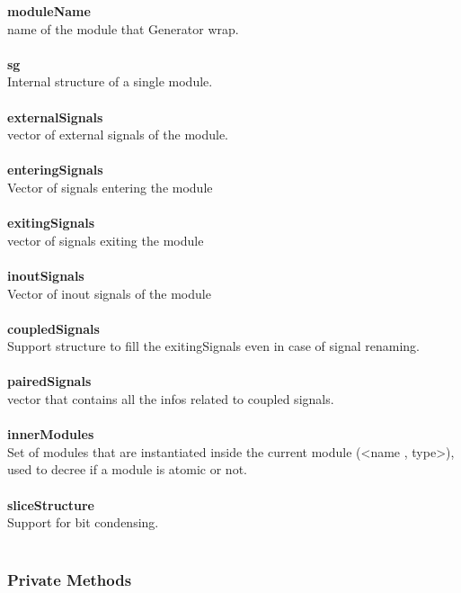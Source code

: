 \documentclass{article}
\begin{document}
\textbf{moduleName}\\
name of the module that Generator wrap.\\\\

\textbf{sg}\\
Internal structure of a single module.\\\\

\textbf{externalSignals}\\
vector of external signals of the module.\\\\

\textbf{enteringSignals}\\
Vector of signals entering the module\\\\

\textbf{exitingSignals}\\
vector of signals exiting the module\\\\

\textbf{inoutSignals}\\
Vector of inout signals of the module\\\\

\textbf{coupledSignals}\\
Support structure to fill the exitingSignals even in case of signal renaming.\\\\

\textbf{pairedSignals}\\
vector that contains all the infos related to coupled signals.\\\\

\textbf{innerModules}\\
Set of modules that are instantiated inside the current module (<name , type>), used to decree if a module is atomic or not.\\\\

\textbf{sliceStructure}\\
Support for bit condensing.\\\\

\subsubsection{Private Methods}
\end{document}
